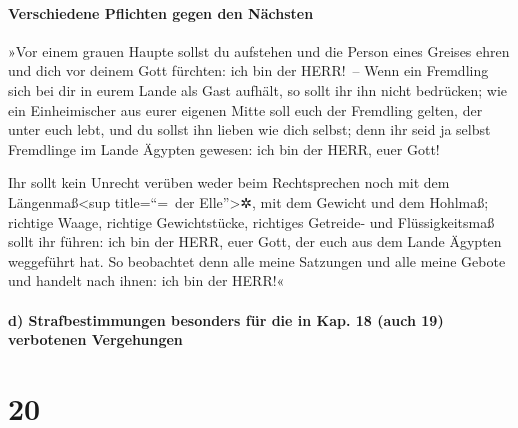 \hypertarget{verschiedene-pflichten-gegen-den-nuxe4chsten}{%
\paragraph{Verschiedene Pflichten gegen den
Nächsten}\label{verschiedene-pflichten-gegen-den-nuxe4chsten}}

»Vor einem grauen Haupte sollst du aufstehen und die
Person eines Greises ehren und dich vor deinem Gott fürchten: ich bin
der HERR!~-- Wenn ein Fremdling sich bei dir in eurem
Lande als Gast aufhält, so sollt ihr ihn nicht bedrücken;
wie ein Einheimischer aus eurer eigenen Mitte soll euch
der Fremdling gelten, der unter euch lebt, und du sollst ihn lieben wie
dich selbst; denn ihr seid ja selbst Fremdlinge im Lande Ägypten
gewesen: ich bin der HERR, euer Gott!

Ihr sollt kein Unrecht verüben weder beim Rechtsprechen
noch mit dem Längenmaß\textless sup title=``=~der Elle''\textgreater✲,
mit dem Gewicht und dem Hohlmaß; richtige Waage, richtige
Gewichtstücke, richtiges Getreide- und Flüssigkeitsmaß sollt ihr führen:
ich bin der HERR, euer Gott, der euch aus dem Lande Ägypten weggeführt
hat. So beobachtet denn alle meine Satzungen und alle
meine Gebote und handelt nach ihnen: ich bin der HERR!«

\hypertarget{d-strafbestimmungen-besonders-fuxfcr-die-in-kap.-18-auch-19-verbotenen-vergehungen}{%
\paragraph{d) Strafbestimmungen besonders für die in Kap. 18 (auch 19)
verbotenen
Vergehungen}\label{d-strafbestimmungen-besonders-fuxfcr-die-in-kap.-18-auch-19-verbotenen-vergehungen}}

\hypertarget{section-19}{%
\section{20}\label{section-19}}

